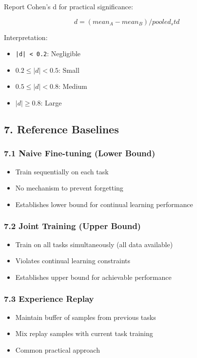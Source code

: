 \documentclass[11pt]{article}
\begin{document}
Report Cohen's d for practical significance:

\[
d = (mean_A - mean_B) / pooled_std
\]

Interpretation:

\begin{itemize}[leftmargin=*]
\item \texttt{|d| < 0.2}: Negligible
\item $0.2 \le  |d| < 0.5$: Small
\item $0.5 \le  |d| < 0.8$: Medium
\item $|d| \ge  0.8$: Large
\end{itemize}

\subsection{7. Reference Baselines}

\subsubsection{7.1 Naive Fine-tuning (Lower Bound)}

\begin{itemize}[leftmargin=*]
\item Train sequentially on each task
\item No mechanism to prevent forgetting
\item Establishes lower bound for continual learning performance
\end{itemize}

\subsubsection{7.2 Joint Training (Upper Bound)}

\begin{itemize}[leftmargin=*]
\item Train on all tasks simultaneously (all data available)
\item Violates continual learning constraints
\item Establishes upper bound for achievable performance
\end{itemize}

\subsubsection{7.3 Experience Replay}

\begin{itemize}[leftmargin=*]
\item Maintain buffer of samples from previous tasks
\item Mix replay samples with current task training
\item Common practical approach
\end{itemize}
\end{document}
